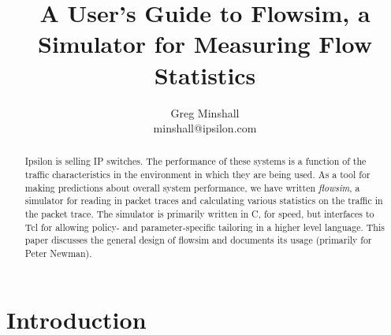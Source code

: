 \documentclass{article}
\begin{document}
\newcommand{\NAME}{\item[NAME]}
\newcommand{\SYNOPSIS}{\item[SYNOPSIS]}
\newcommand{\DESCRIPTION}{\item[DESCRIPTION]}
\newcommand{\RETURNVALUES}{\item[RETURN VALUES]}
\newcommand{\RETURNDESC}{\item[DESCRIPTION OF RETURN VALUES]}
\newcommand{\KEYWORDS}{\item[KEYWORDS]}
\newcommand{\SEEALSO}{\item[SEE ALSO]}
\newcommand{\BUGS}{\item[BUGS]}

\newcommand{\man}[2]{\newpage\subsection{#1}\renewcommand{\cmdname}{\cmd{#1}}\begin{description}\NAME #1 --- #2}
\newcommand{\manend}{\end{description}}
\newcommand{\cmd}[1]{\textbf{#1}}
\newcommand{\cmdarg}[1]{\textit{#1}}
\newcommand{\cmdname}{WHERE IS THE COMMAND NAME?}

\title{A User's Guide to Flowsim, a Simulator for Measuring Flow Statistics}

\author{Greg Minshall \\ minshall@ipsilon.com}

\maketitle

\begin{abstract}
Ipsilon is selling IP switches.  The performance of these systems is a
function of the traffic characteristics in the environment in which
they are being used.  As a tool for making predictions about overall
system performance, we have written \emph{flowsim}, a simulator for
reading in packet traces and calculating various statistics on the
traffic in the packet trace.  The simulator is primarily written in C,
for speed, but interfaces to Tcl for allowing policy- and
parameter-specific tailoring in a higher level language.
This paper discusses the general design of flowsim and documents its
usage (primarily for Peter Newman).
\end{abstract}

\section{Introduction}
\end{document}

